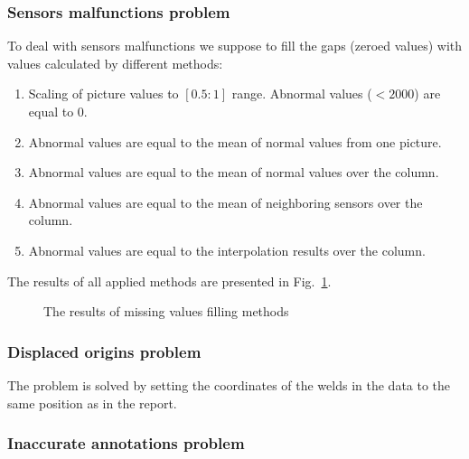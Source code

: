 \subsubsection{Sensors malfunctions problem}
To deal with sensors malfunctions we suppose to fill the gaps (zeroed values) with values calculated by different methods:
\begin{enumerate}
	\item Scaling of picture values to $[0.5:1]$ range. Abnormal values ($<2000$) are equal to 0.
	\item Abnormal values are equal to the mean of normal values from one picture.
	\item Abnormal values are equal to the mean of normal values over the column.
	\item Abnormal values are equal to the mean of neighboring sensors over the column.
	\item Abnormal values are equal to the interpolation results over the column.
\end{enumerate}
The results of all applied methods are presented in Fig.~\ref{ris:filling_example}.
\begin{figure}[ht]
	\caption{The results of missing values filling methods}
	\label{ris:filling_example}
\end{figure}

\subsubsection{Displaced origins problem}
The problem is solved by setting the coordinates of the welds in the data to the same position as in the report.

\subsubsection{Inaccurate annotations problem}


